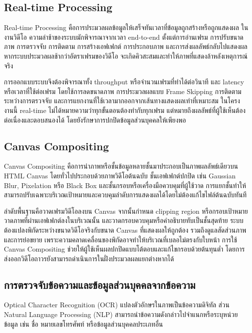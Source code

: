 \subsection{Real-time Processing}

Real-time Processing คือการประมวลผลข้อมูลให้เสร็จทันเวลาที่ข้อมูลถูกสร้างหรือถูกแสดงผล ในงานวิดีโอ ความล่าช้าของระบบมักพิจารณาจากเวลา end-to-end ตั้งแต่การอ่านเฟรม การปรับขนาดภาพ การตรวจจับ การติดตาม การสร้างเอฟเฟกต์ การประกอบภาพ และการส่งผลลัพธ์กลับไปแสดงผล หากระบบประมวลผลช้ากว่าอัตราเฟรมของวิดีโอ จะเกิดคิวสะสมและทำให้ภาพที่แสดงล้าหลังเหตุการณ์จริง \cite{bewley2016sort}

การออกแบบระบบจึงต้องพิจารณาทั้ง throughput หรือจำนวนเฟรมที่ทำได้ต่อวินาที และ latency หรือเวลาที่ใช้ต่อเฟรม โดยใช้การลดขนาดภาพ การประมวลผลแบบ Frame Skipping การติดตามระหว่างการตรวจจับ และการแยกงานที่ใช้เวลามากออกจากเส้นทางแสดงผลเท่าที่เหมาะสม ในโครงงานนี้ real-time ไม่ได้หมายความว่าทุกขั้นตอนต้องทำกับทุกเฟรม แต่หมายถึงผลลัพธ์ที่ผู้ใช้เห็นต้องต่อเนื่องและตอบสนองได้ โดยยังรักษาการปกปิดข้อมูลส่วนบุคคลให้เพียงพอ

\subsection{Canvas Compositing}

Canvas Compositing คือการนำภาพหรือชั้นข้อมูลหลายชั้นมาประกอบเป็นภาพผลลัพธ์เดียวบน HTML Canvas โดยทั่วไปประกอบด้วยภาพวิดีโอต้นฉบับ ชั้นเอฟเฟกต์ปกปิด เช่น Gaussian Blur, Pixelation หรือ Black Box และชั้นกรอบหรือเครื่องมือควบคุมที่ผู้ใช้วาด การแยกชั้นทำให้สามารถปรับเฉพาะบริเวณเป้าหมายและควบคุมลำดับการแสดงผลได้โดยไม่ต้องแก้ไขไฟล์ต้นฉบับทันที \cite{mdn_canvas}

ลำดับพื้นฐานคือวาดเฟรมวิดีโอลงบน Canvas จากนั้นกำหนด clipping region หรือกรอบเป้าหมาย วาดภาพที่ผ่านเอฟเฟกต์ลงในบริเวณนั้น และวาดกรอบควบคุมหรือคำอธิบายทับเป็นชั้นสุดท้าย ระบบต้องแปลงพิกัดระหว่างขนาดวิดีโอจริงกับขนาด Canvas ที่แสดงผลให้ถูกต้อง รวมถึงดูแลสัดส่วนภาพและการย่อขยาย เพราะความคลาดเคลื่อนของพิกัดอาจทำให้บริเวณที่เบลอไม่ตรงกับใบหน้า การใช้ Canvas Compositing ช่วยให้ผู้ใช้เห็นผลปกปิดแบบโต้ตอบและแก้ไขกรอบด้วยต้นทุนต่ำ โดยการส่งออกวิดีโอถาวรยังสามารถดำเนินการในฝั่งประมวลผลแยกต่างหากได้

\subsection{การตรวจจับข้อความและข้อมูลส่วนบุคคลจากข้อความ}

Optical Character Recognition (OCR) แปลงตัวอักษรในภาพเป็นข้อความดิจิทัล ส่วน Natural Language Processing (NLP) สามารถนำข้อความดังกล่าวไปจำแนกหรือระบุหน่วยข้อมูล เช่น ชื่อ หมายเลขโทรศัพท์ หรือข้อมูลส่วนบุคคลประเภทอื่น \cite{pii_label}

